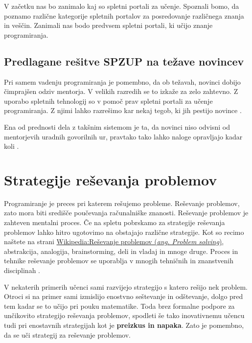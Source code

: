 V začetku nas bo zanimalo kaj so spletni portali za učenje. Spoznali
bomo, da poznamo različne kategorije spletnih portalov za posredovanje
različnega znanja in veščin. Zanimali nas bodo  predvsem spletni
portali, ki učijo znanje programiranja.

\subsection{Predlagane rešitve SPZUP na težave novincev}
\label{predlagane_rešitve_na_težave_novincev}

Pri samem vadenju programiranja je pomembno, da ob težavah, novinci
dobijo čimprajšen odziv mentorja. V velikih razredih se to izkaže za
zelo zahtevno. Z uporabo spletnih tehnologij so v pomoč prav spletni
portali za učenje programiranja. Z njimi lahko razrešimo kar nekaj
tegob, ki jih pestijo novince \cite{thesisAWebP}.

Ena od prednosti dela z takšnim sistemom je ta, da novinci niso odvisni
od mentorjevih uradnih govorilnih ur, pravtako tako lahko naloge
opravljajo kadar koli \cite{thesisAWebP}.

\section{Strategije reševanja problemov}
\label{sec:strategije_reševanja_problemov}

Programiranje je preces pri katerem rešujemo probleme. Reševanje
problemov, zato mora biti središče poučevanja računalniške
znanosti. Reševanje problemov je zahteven mentalni proces. Če na
spletu pobrskamo za strategije reševanja problemov lahko hitro
ugotovimo na obstajajo različne strategije. Kot so recimo naštete na
strani
\href{https://en.wikipedia.org/wiki/Problem_solving#Problem-solving_strategies}{Wikipedia:Reševanje
  problemov (\emph{ang. Problem solving})}, abstrakcija, analogija,
brainstorming, deli in vladaj in mnoge druge.  Proces in tehnike
reševanje problemov se uporablja v mnogih tehničnih in znanstvenih
disciplinah \cite{guideTCS}.

V nekaterih primerih učenci sami razvijejo strategijo s katero rešijo
nek problem. Otroci si na primer sami izmislijo enostvno seštevanje in
odštevanje, dolgo pred tem kadar se to učijo pri pouku
matematike. Toda brez formalne podpore za unčikovito strategijo
reševanja problemov, spodleti še tako inovativnemu učencu tudi pri
enostavnih strategijah kot je \textbf{preizkus in napaka}. Zato je
pomembno, da se uči strategij za reševanje problemov.


